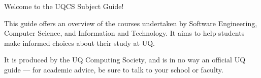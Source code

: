 Welcome to the \the\year UQCS Subject Guide!

This guide offers an overview of the courses undertaken by Software Engineering, Computer Science, and Information and Technology.
It aims to help students make informed choices about their study at UQ.

It is produced by the UQ Computing Society, and is in no way an official UQ guide --- for academic advice, be sure to talk to your school or faculty.
